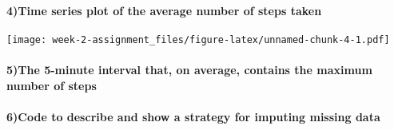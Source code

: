 \documentclass[]{article}
\newenvironment{Shaded}{\begin{snugshade}}{\end{snugshade}}
\newcommand{\KeywordTok}[1]{\textcolor[rgb]{0.13,0.29,0.53}{\textbf{#1}}}
\newcommand{\DataTypeTok}[1]{\textcolor[rgb]{0.13,0.29,0.53}{#1}}
\newcommand{\StringTok}[1]{\textcolor[rgb]{0.31,0.60,0.02}{#1}}
\newcommand{\OtherTok}[1]{\textcolor[rgb]{0.56,0.35,0.01}{#1}}
\newcommand{\OperatorTok}[1]{\textcolor[rgb]{0.81,0.36,0.00}{\textbf{#1}}}
\newcommand{\NormalTok}[1]{#1}
\let\oldparagraph\paragraph
\renewcommand{\paragraph}[1]{\oldparagraph{#1}\mbox{}}
\begin{document}
\paragraph{4)Time series plot of the average number of steps
taken}\label{time-series-plot-of-the-average-number-of-steps-taken}

\begin{Shaded}
\end{Shaded}

\texttt{[image: week-2-assignment\_files/figure-latex/unnamed-chunk-4-1.pdf]}

\paragraph{5)The 5-minute interval that, on average, contains the
maximum number of
steps}\label{the-5-minute-interval-that-on-average-contains-the-maximum-number-of-steps}

\begin{Shaded}
\end{Shaded}

\paragraph{6)Code to describe and show a strategy for imputing missing
data}\label{code-to-describe-and-show-a-strategy-for-imputing-missing-data}

\begin{Shaded}
\end{Shaded}
\end{document}
